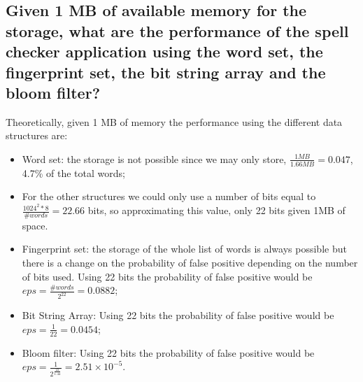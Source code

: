\documentclass[twocolumn,letterpaper]{report}
\begin{document}
{\begin{table}[h!]
				\end{table}
				
				\subsection{Given 1 MB of available memory for the storage, what are the performance of the spell checker application using the word set, the fingerprint set, the bit string array and the bloom filter?}
				Theoretically, given 1 MB of memory the performance using the different data structures are:
				\begin{itemize}
					\item Word set: the storage is not possible since we may only store, $\frac{1MB}{1.66MB}=0.047$, 4.7\% of the total words;
					\item[] For the other structures we could only use a number of bits equal to $\frac{1024^2*8}{\#words}=22.66$ bits, so approximating this value, only 22 bits given 1MB of space.
					\item Fingerprint set: the storage of the whole list of words is always possible but there is a change on the probability of false positive depending on the number of bits used. Using 22 bits the probability of false positive would be $eps=\frac{\#words}{2^{22}}=0.0882$; 
					\item Bit String Array: Using 22 bits the probability of false positive would be $eps=\frac{1}{22}=0.0454$;
					\item Bloom filter: Using 22 bits the probability of false positive would be $eps=\frac{1}{2^{\frac{22}{1.44}}}=2.51 \times 10^{-5}$. 
				\end{itemize}
				

}
\end{document}
